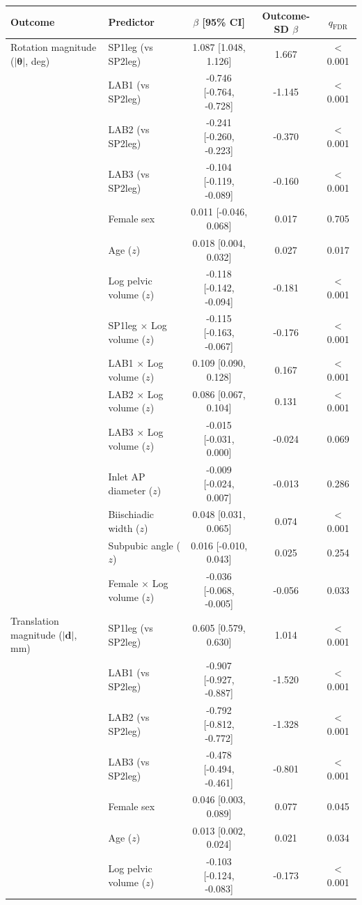 \begin{tabular}{llccc}
\toprule
Outcome & Predictor & $\beta$ [95\% CI] & Outcome-SD $\beta$ & $q_{\text{FDR}}$ \\
\midrule
Rotation magnitude ($|\boldsymbol{\theta}|$, deg) & SP1leg (vs SP2leg) & 1.087 [1.048, 1.126] & 1.667 & < 0.001 \\
 & LAB1 (vs SP2leg) & -0.746 [-0.764, -0.728] & -1.145 & < 0.001 \\
 & LAB2 (vs SP2leg) & -0.241 [-0.260, -0.223] & -0.370 & < 0.001 \\
 & LAB3 (vs SP2leg) & -0.104 [-0.119, -0.089] & -0.160 & < 0.001 \\
 & Female sex & 0.011 [-0.046, 0.068] & 0.017 & 0.705 \\
 & Age ($z$) & 0.018 [0.004, 0.032] & 0.027 & 0.017 \\
 & Log pelvic volume ($z$) & -0.118 [-0.142, -0.094] & -0.181 & < 0.001 \\
 & SP1leg $\times$ Log volume ($z$) & -0.115 [-0.163, -0.067] & -0.176 & < 0.001 \\
 & LAB1 $\times$ Log volume ($z$) & 0.109 [0.090, 0.128] & 0.167 & < 0.001 \\
 & LAB2 $\times$ Log volume ($z$) & 0.086 [0.067, 0.104] & 0.131 & < 0.001 \\
 & LAB3 $\times$ Log volume ($z$) & -0.015 [-0.031, 0.000] & -0.024 & 0.069 \\
 & Inlet AP diameter ($z$) & -0.009 [-0.024, 0.007] & -0.013 & 0.286 \\
 & Biischiadic width ($z$) & 0.048 [0.031, 0.065] & 0.074 & < 0.001 \\
 & Subpubic angle ($z$) & 0.016 [-0.010, 0.043] & 0.025 & 0.254 \\
 & Female $\times$ Log volume ($z$) & -0.036 [-0.068, -0.005] & -0.056 & 0.033 \\
\midrule
Translation magnitude ($|\mathbf{d}|$, mm) & SP1leg (vs SP2leg) & 0.605 [0.579, 0.630] & 1.014 & < 0.001 \\
 & LAB1 (vs SP2leg) & -0.907 [-0.927, -0.887] & -1.520 & < 0.001 \\
 & LAB2 (vs SP2leg) & -0.792 [-0.812, -0.772] & -1.328 & < 0.001 \\
 & LAB3 (vs SP2leg) & -0.478 [-0.494, -0.461] & -0.801 & < 0.001 \\
 & Female sex & 0.046 [0.003, 0.089] & 0.077 & 0.045 \\
 & Age ($z$) & 0.013 [0.002, 0.024] & 0.021 & 0.034 \\
 & Log pelvic volume ($z$) & -0.103 [-0.124, -0.083] & -0.173 & < 0.001 \\

\end{tabular}
